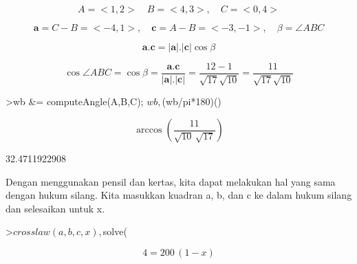 \documentclass[a4paper,10pt]{article}
\begin{document}
\begin{eulernotebook}
\begin{eulercomment}
\begin{eulercomment}
\begin{eulercomment}
\begin{eulercomment}
\begin{eulercomment}
\begin{eulercomment}
\begin{eulercomment}
\begin{eulercomment}
\begin{eulercomment}
\begin{eulercomment}
\begin{eulercomment}
\begin{eulercomment}
\begin{eulercomment}
\begin{eulercomment}
\begin{eulercomment}
\begin{eulercomment}
\begin{eulercomment}
\begin{eulercomment}
\begin{eulercomment}
\begin{eulercomment}
\begin{eulercomment}
\begin{eulercomment}
\begin{eulercomment}
\begin{eulercomment}
\begin{eulercomment}
\begin{eulercomment}
\begin{eulercomment}
\begin{eulercomment}
\begin{eulercomment}
\begin{eulercomment}
\begin{eulercomment}
\begin{eulercomment}
\begin{eulercomment}
\end{eulercomment}
\begin{eulerformula}
\[
A=<1,2>\quad B=<4,3>,\quad C=<0,4>
\]
\end{eulerformula}
\begin{eulerformula}
\[
\mathbf{a}=C-B=<-4,1>,\quad \mathbf{c}=A-B=<-3,-1>,\quad \beta=\angle ABC
\]
\end{eulerformula}
\begin{eulerformula}
\[
\mathbf{a}.\mathbf{c}=|\mathbf{a}|.|\mathbf{c}|\cos \beta
\]
\end{eulerformula}
\begin{eulerformula}
\[
\cos \angle ABC =\cos\beta=\frac{\mathbf{a}.\mathbf{c}}{|\mathbf{a}|.|\mathbf{c}|}=\frac{12-1}{\sqrt{17}\sqrt{10}}=\frac{11}{\sqrt{17}\sqrt{10}}
\]
\end{eulerformula}
\begin{eulerprompt}
>wb &= computeAngle(A,B,C); $wb, $(wb/pi*180)()
\end{eulerprompt}
\begin{eulerformula}
\[
\arccos \left(\frac{11}{\sqrt{10}\,\sqrt{17}}\right)
\]
\end{eulerformula}
\begin{euleroutput}
  32.4711922908
\end{euleroutput}
\begin{eulercomment}
Dengan menggunakan pensil dan kertas, kita dapat melakukan hal yang
sama dengan hukum silang. Kita masukkan kuadran a, b, dan c ke dalam
hukum silang dan selesaikan untuk x.
\end{eulercomment}
\begin{eulerprompt}
>$crosslaw(a,b,c,x), $solve(%
\end{eulerprompt}
\begin{eulerformula}
\[
4=200\,\left(1-x\right)
\]
\end{eulerformula}
\begin{eulerformula}
\[
\]
\end{eulerformula}
\end{eulercomment}
\end{eulercomment}
\end{eulercomment}
\end{eulercomment}
\end{eulercomment}
\end{eulercomment}
\end{eulercomment}
\end{eulercomment}
\end{eulercomment}
\end{eulercomment}
\end{eulercomment}
\end{eulercomment}
\end{eulercomment}
\end{eulercomment}
\end{eulercomment}
\end{eulercomment}
\end{eulercomment}
\end{eulercomment}
\end{eulercomment}
\end{eulercomment}
\end{eulercomment}
\end{eulercomment}
\end{eulercomment}
\end{eulercomment}
\end{eulercomment}
\end{eulercomment}
\end{eulercomment}
\end{eulercomment}
\end{eulercomment}
\end{eulercomment}
\end{eulercomment}
\end{eulercomment}
\end{eulernotebook}
\end{document}
